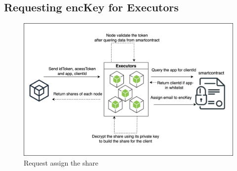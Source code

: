 \documentclass[../Main.tex]{subfiles}
\begin{document}
\subsection{Requesting encKey for Executors}
\begin{figure}[H]
 \centering
 \includegraphics[scale=0.14]{Figure/request-share.png}
    \caption{Request assign the share}
    \label{fig:request-share}
\end{figure}
\end{document}
